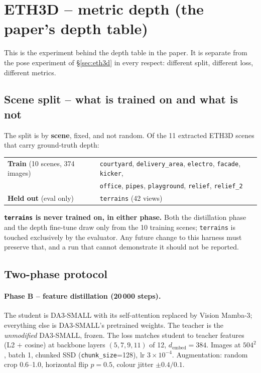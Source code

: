 \documentclass[11pt,a4paper]{article}
\begin{document}
\section{ETH3D -- metric depth (the paper's depth table)}
\label{sec:eth3d-depth}

This is the experiment behind the depth table in the paper. It is separate from
the pose experiment of \S\ref{sec:eth3d} in every respect: different split,
different loss, different metrics.

\subsection{Scene split -- what is trained on and what is not}
\label{sec:eth3d-depth-split}

The split is by \textbf{scene}, fixed, and not random. Of the 11 extracted
ETH3D scenes that carry ground-truth depth:

\begin{center}
\begin{tabular}{ll}
\toprule
\textbf{Train} (10 scenes, 374 images) &
  \texttt{courtyard}, \texttt{delivery\_area}, \texttt{electro},
  \texttt{facade}, \texttt{kicker}, \\
 & \texttt{office}, \texttt{pipes}, \texttt{playground},
  \texttt{relief}, \texttt{relief\_2} \\
\midrule
\textbf{Held out} (eval only) & \texttt{terrains} (42 views) \\
\bottomrule
\end{tabular}
\end{center}

\noindent\textbf{\texttt{terrains} is never trained on, in either phase.} Both
the distillation phase and the depth fine-tune draw only from the 10 training
scenes; \texttt{terrains} is touched exclusively by the evaluator. Any future
change to this harness must preserve that, and a run that cannot demonstrate it
should not be reported.

\subsection{Two-phase protocol}
\label{sec:eth3d-depth-protocol}

\paragraph{Phase B -- feature distillation (20\,000 steps).}
The student is DA3-SMALL with its self-attention replaced by Vision Mamba-3;
everything else is DA3-SMALL's pretrained weights. The teacher is the
\emph{unmodified} DA3-SMALL, frozen. The loss matches student to teacher
features (L2 $+$ cosine) at backbone layers $(5,7,9,11)$ of 12,
$d_{\text{embed}}=384$. Images at $504^2$, batch 1, chunked SSD
(\texttt{chunk\_size}=128), lr $3\times10^{-4}$. Augmentation: random crop
0.6--1.0, horizontal flip $p=0.5$, colour jitter $\pm0.4/0.1$.
\end{document}
